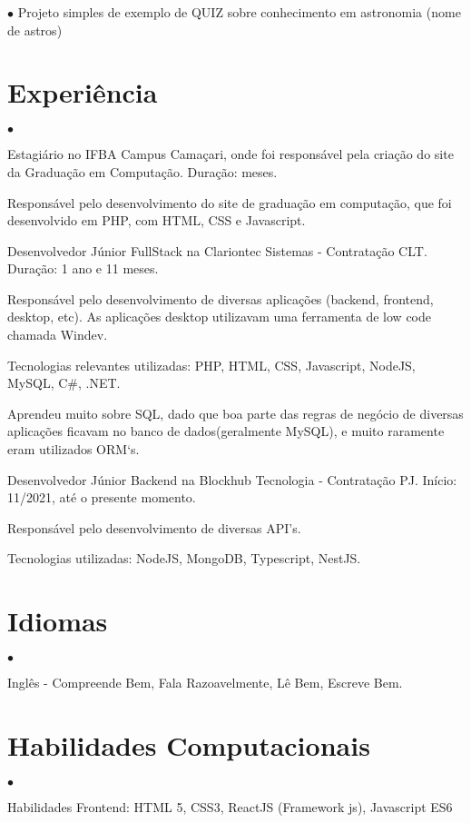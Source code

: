 \documentclass[margin,line]{res}
\newenvironment{list2}{
 \begin{list}{$\bullet$}{%
     \setlength{\itemsep}{0in}
     \setlength{\parsep}{0in} \setlength{\parskip}{0in}
     \setlength{\topsep}{0in} \setlength{\partopsep}{0in}
     \setlength{\leftmargin}{0.2in}}}{\end{list}}
\begin{document}
\begin{resume}
\begin{list2}
    Projeto simples de exemplo de QUIZ sobre conhecimento em astronomia (nome de astros)
\end{list2}
\vspace{0.2cm}
\section{Experiência}
\begin{list2}
\item Estagiário no IFBA Campus Camaçari, onde foi responsável pela criação do site da Graduação em Computação. Duração: meses.

    Responsável pelo desenvolvimento do site de graduação em computação, que foi desenvolvido em PHP, com HTML, CSS e Javascript.

\item Desenvolvedor Júnior FullStack na Clariontec Sistemas - Contratação CLT. Duração: 1 ano e 11 meses.

    Responsável pelo desenvolvimento de diversas aplicações (backend, frontend, desktop, etc). As aplicações desktop utilizavam uma ferramenta de low code chamada Windev.

    Tecnologias relevantes utilizadas: PHP, HTML, CSS, Javascript, NodeJS, MySQL, C\#, .NET.

    Aprendeu muito sobre SQL, dado que boa parte das regras de negócio de diversas aplicações ficavam no banco de dados(geralmente MySQL), e muito raramente eram utilizados ORM`s.

\item Desenvolvedor Júnior Backend na Blockhub Tecnologia - Contratação PJ. Início: 11/2021, até o presente momento.

    Responsável pelo desenvolvimento de diversas API's.

    Tecnologias utilizadas: NodeJS, MongoDB, Typescript, NestJS.
\end{list2}
\vspace{0.2cm}
\section{Idiomas}
\begin{list2}
\item Inglês - Compreende Bem, Fala Razoavelmente, Lê Bem, Escreve Bem.
\end{list2}
\vspace{0.2cm}
\section{Habilidades Computacionais}
\begin{list2}
\item Habilidades Frontend: HTML 5, CSS3, ReactJS (Framework js), Javascript ES6


\end{list2}
\end{resume}
\end{document}
